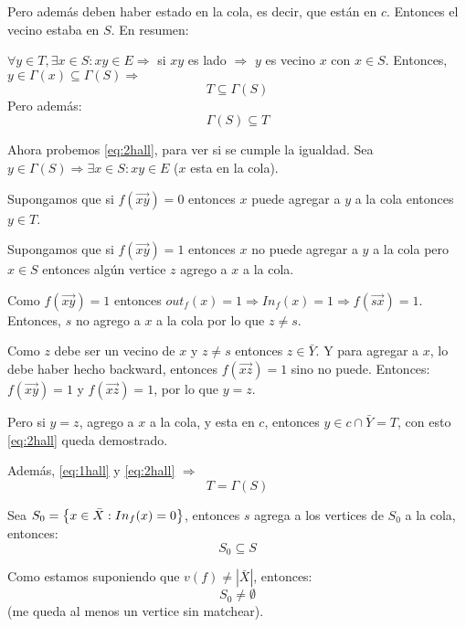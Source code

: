 \documentclass[12pt,a4paper]{article}
\begin{document}
Pero además deben haber estado en la cola, es decir, que están en $c$. Entonces 
el vecino estaba en $S$. En resumen:
\medskip

$\forall y\in T, \exists x\in S: xy \in E \Rightarrow$ si $xy$ es lado $\Rightarrow$
$y$ es vecino $x$ con $x\in S$. Entonces, $y\in \Gamma(x) \subseteq \Gamma(S) \Rightarrow$
\begin{equation}
    T \subseteq \Gamma(S)
    \label{eq:1hall}
\end{equation}
Pero además:
\begin{equation}
    \Gamma(S) \subseteq T
    \label{eq:2hall}
\end{equation}

Ahora probemos \ref{eq:2hall}, para ver si se cumple la igualdad. Sea 
$y\in \Gamma(S) \Rightarrow \exists x\in S: xy\in E$ ($x$ esta en la cola).
\medskip

Supongamos que si $f(\overrightarrow{xy}) = 0$ entonces $x$ puede agregar a $y$ 
a la cola entonces $y \in T$.
\medskip

Supongamos que si $f(\overrightarrow{xy}) = 1$ entonces $x$ no puede agregar a $y$ 
a la cola pero $x\in S$ entonces algún vertice $z$ agrego a $x$ a la cola.
\medskip

Como $f(\overrightarrow{xy}) = 1$ entonces $out_{f}(x)=1 \Rightarrow In_{f}(x)=1 \Rightarrow f(\overrightarrow{sx})=1$.
Entonces, $s$ no agrego a $x$ a la cola por lo que $z \neq s$.
\medskip

Como $z$ debe ser un vecino de $x$ y $z \neq s$ entonces $z \in \bar{Y}$. Y para 
agregar a $x$, lo debe haber hecho backward, entonces $f(\overrightarrow{xz})=1$ 
sino no puede. Entonces: $f(\overrightarrow{xy})=1$ y $f(\overrightarrow{xz}) = 1$, 
por lo que $y=z$.
\medskip

Pero si $y=z$, agrego a $x$ a la cola, y esta en $c$, entonces 
$y\in c \cap \bar{Y} = T$, con esto \ref{eq:2hall} queda demostrado.
\medskip

Además, \ref{eq:1hall} y \ref{eq:2hall} $\Rightarrow$ 
\begin{equation}
    T = \Gamma(S)
    \label{eq:3hall}
\end{equation}

Sea $S_{0} = \left\lbrace x\in \bar{X}: In_{f}(x)=0 \right\rbrace$, entonces $s$ agrega a los vertices 
de $S_{0}$ a la cola, entonces:
\begin{equation}
    S_{0} \subseteq S
    \label{eq:4hall}
\end{equation}

Como estamos suponiendo que $v(f) \neq |\bar{X}|$, entonces:
\begin{equation}
    S_{0} \neq \emptyset
    \label{eq:5hall}
\end{equation}
(me queda al menos un vertice sin matchear).
\medskip
\end{document}
